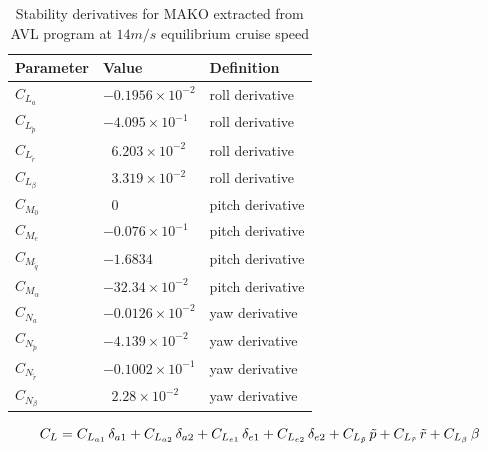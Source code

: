 \begin{table}
\label{arm:momentsMAKO}
\caption{Stability derivatives for MAKO extracted from AVL program at $14 m/s$ equilibrium cruise speed \cite{bronz2016aerodynamic}}
\label{arm:MAKOstabilityDeriv}
\begin{center}
\begin{tabular}{ ||p{3cm}|p{3cm}|p{3cm}||}\hline
\textbf{Parameter} & \textbf{Value} & \textbf{Definition} \\\hline
$C_{L_a}$                             & $-0.1956 \times 10^{-2}$	   & roll derivative \\\hline
$C_{L_{\tilde{p}}}$                 & $-4.095 \times 10^{-1}$	   & roll derivative \\\hline
$C_{L_{\tilde{r}}} $                 & $\ \ \, 6.203 \times 10^{-2}$     & roll derivative \\\hline
$C_{L_\beta}$                        & $\ \ \, 3.319 \times 10^{-2}$	   & roll derivative \\\hline
$C_{M_0}$ 			     & $\ \ \, 0$  &  pitch derivative \\\hline
$C_{M_e}$ 			     & $-0.076 \times 10^{-1}$  &  pitch derivative \\\hline
$C_{M_{\tilde{q}}} $               & $-1.6834$	                            & pitch derivative \\\hline
$C_{M_\alpha} $                    & $-32.34 \times 10^{-2}$ 	   & pitch derivative \\\hline
$C_{N_a}$                             & $-0.0126 \times 10^{-2}$	   & yaw derivative \\\hline
$C_{N_{\tilde{p}}}$                 & $-4.139 \times 10^{-2}$ 	   & yaw derivative \\\hline
$C_{N_{\tilde{r}}}$                 & $-0.1002 \times 10^{-1}$	   & yaw derivative \\\hline
$C_{N_\beta} $                      & $\ \ \, 2.28 \times 10^{-2}$	   & yaw derivative \\\hline
\end{tabular}
\end{center}
\end{table}

\begin{equation}{\label{eqn:bigCraftC_L}}
C_L = C_{L_{a1}} \, \delta_{a1} + C_{L_{a2}} \, \delta_{a2} + C_{L_{e1}} \, \delta_{e1} + C_{L_{e2}} \, \delta_{e2} + C_{L_{\tilde{p}}} \, \tilde{p} + C_{L_{\tilde{r}}} \, \tilde{r} +  C_{L_\beta} \, \beta 
\end{equation}

